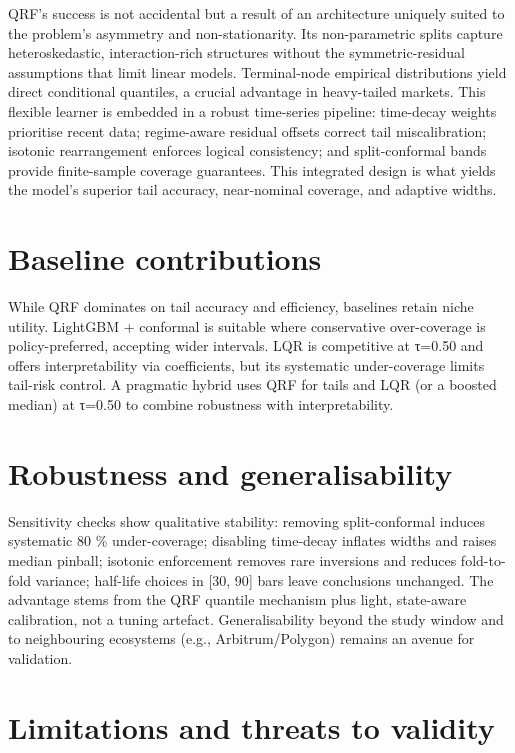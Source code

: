 \documentclass[
  a4paper,
  DIV=11,
  numbers=noendperiod]{scrreprt}
\begin{document}
QRF's success is not accidental but a result of an architecture uniquely
suited to the problem's asymmetry and non-stationarity. Its
non-parametric splits capture heteroskedastic, interaction-rich
structures without the symmetric-residual assumptions that limit linear
models. Terminal-node empirical distributions yield direct conditional
quantiles, a crucial advantage in heavy-tailed markets. This flexible
learner is embedded in a robust time-series pipeline: time-decay weights
prioritise recent data; regime-aware residual offsets correct tail
miscalibration; isotonic rearrangement enforces logical consistency; and
split-conformal bands provide finite-sample coverage guarantees. This
integrated design is what yields the model's superior tail accuracy,
near-nominal coverage, and adaptive widths.

\section{Baseline contributions}\label{baseline-contributions}

While QRF dominates on tail accuracy and efficiency, baselines retain
niche utility. LightGBM + conformal is suitable where conservative
over-coverage is policy-preferred, accepting wider intervals. LQR is
competitive at τ=0.50 and offers interpretability via coefficients, but
its systematic under-coverage limits tail-risk control. A pragmatic
hybrid uses QRF for tails and LQR (or a boosted median) at τ=0.50 to
combine robustness with interpretability.

\section{Robustness and
generalisability}\label{robustness-and-generalisability}

Sensitivity checks show qualitative stability: removing split-conformal
induces systematic 80 \% under-coverage; disabling time-decay inflates
widths and raises median pinball; isotonic enforcement removes rare
inversions and reduces fold-to-fold variance; half-life choices in
{[}30, 90{]} bars leave conclusions unchanged. The advantage stems from
the QRF quantile mechanism plus light, state-aware calibration, not a
tuning artefact. Generalisability beyond the study window and to
neighbouring ecosystems (e.g., Arbitrum/Polygon) remains an avenue for
validation.

\section{Limitations and threats to
validity}\label{limitations-and-threats-to-validity}
\end{document}
